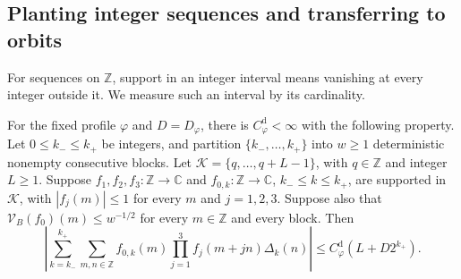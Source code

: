 \subsection{Planting integer sequences and transferring to orbits}

For sequences on \(\mathbb Z\), support in an integer interval means
vanishing at every integer outside it.  We measure such an interval by
its cardinality.

\begin{lemma}
\label{lem:transfer-discrete}
For the fixed profile \(\varphi\) and \(D=D_\varphi\), there is
\(C_\varphi^{\mathrm d}<\infty\) with the following property.
Let \(0\leq k_-\leq k_+\) be integers, and partition
\(\{k_-,\ldots,k_+\}\) into \(w\geq1\) deterministic nonempty consecutive
blocks.  Let \(\mathcal K=\{q,\ldots,q+L-1\}\), with \(q\in\mathbb Z\)
and integer \(L\geq1\).  Suppose
\(f_1,f_2,f_3:\mathbb Z\to\mathbb C\) and
\(f_{0,k}:\mathbb Z\to\mathbb C\), \(k_-\leq k\leq k_+\), are supported
in \(\mathcal K\), with \(|f_j(m)|\leq1\) for every \(m\) and
\(j=1,2,3\).  Suppose also that
\(\mathcal V_B(f_0)(m)\leq w^{-1/2}\) for every \(m\in\mathbb Z\) and
every block.  Then
\begin{equation}
 \left|\sum_{k=k_-}^{k_+}\sum_{m,n\in\mathbb Z}
    f_{0,k}(m)\prod_{j=1}^3f_j(m+jn)\Delta_k(n)\right|
       \leq C_\varphi^{\mathrm d}(L+D2^{k_+}).
 \label{eq:transfer-discrete}
\end{equation}
\end{lemma}

